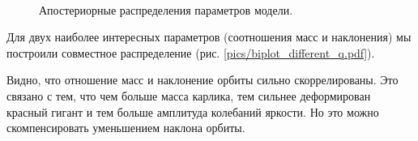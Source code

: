 \begin{figure}
{}\\
\label{fig:dists}
\caption{Апостериорные распределения параметров модели.}
\end{figure}



Для двух наиболее интересных параметров (соотношения масс и наклонения) мы построили совместное распределение (рис. \ref{pics/biplot_different_q.pdf}).

Видно, что отношение масс и наклонение орбиты сильно скоррелированы. Это связано с тем, что чем больше масса карлика, тем сильнее деформирован красный гигант и тем больше амплитуда колебаний яркости. Но это можно скомпенсировать уменьшением наклона орбиты.

